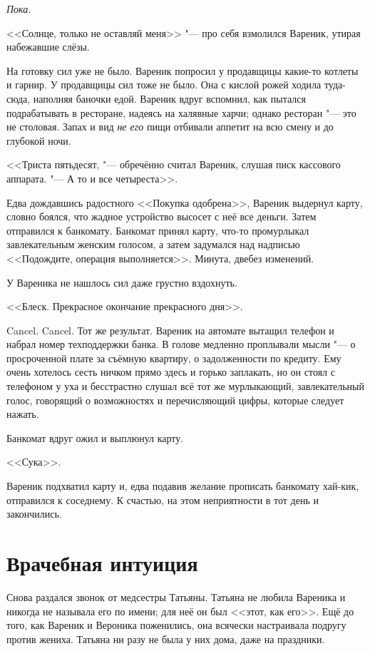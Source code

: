 \emph{Пока.}

<<Солнце, только не оставляй меня\ldotst>> "--- про себя взмолился Вареник, утирая набежавшие слёзы.

На готовку сил уже не было.
Вареник попросил у продавщицы какие-то котлеты и гарнир.
У продавщицы сил тоже не было.
Она с кислой рожей ходила туда-сюда, наполняя баночки едой.
Вареник вдруг вспомнил, как пытался подрабатывать в ресторане, надеясь на халявные харчи;
однако ресторан "--- это не столовая.
Запах и вид \emph{не его} пищи отбивали аппетит на всю смену и до глубокой ночи.

<<Триста пятьдесят, "--- обречённо считал Вареник, слушая писк кассового аппарата.
"--- А то и все четыреста>>.

Едва дождавшись радостного <<Покупка одобрена>>, Вареник выдернул карту, словно боялся, что жадное устройство высосет с неё все деньги.
Затем отправился к банкомату.
Банкомат принял карту, что-то промурлыкал завлекательным женским голосом, а затем задумался над надписью <<Подождите, операция выполняется>>.
Минута, две\ldotst без изменений.

У Вареника не нашлось сил даже грустно вздохнуть.

<<Блеск.
Прекрасное окончание прекрасного дня>>.

Cancel. Cancel.
Тот же результат.
Вареник на автомате вытащил телефон и набрал номер техподдержки банка.
В голове медленно проплывали мысли "--- о просроченной плате за съёмную квартиру, о задолженности по кредиту.
Ему очень хотелось сесть ничком прямо здесь и горько заплакать, но он стоял с телефоном у уха и бесстрастно слушал всё тот же мурлыкающий, завлекательный голос, говорящий о возможностях и перечисляющий цифры, которые следует нажать.

Банкомат вдруг ожил и выплюнул карту.

<<Сука>>.

Вареник подхватил карту и, едва подавив желание прописать банкомату хай-кик, отправился к соседнему.
К счастью, на этом неприятности в тот день и закончились.

\section{Врачебная интуиция}

Снова раздался звонок от медсестры Татьяны.
Татьяна не любила Вареника и никогда не называла его по имени;
для неё он был <<этот, как его>>.
Ещё до того, как Вареник и Вероника поженились, она всячески настраивала подругу против жениха.
Татьяна ни разу не была у них дома, даже на праздники.

